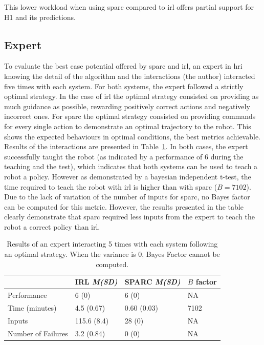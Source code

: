 This lower workload when using \gls{sparc} compared to \gls{irl} offers partial support for H1 and its predictions.

\subsection{Expert} \label{ssec:control_expert}

To evaluate the best case potential offered by \gls{sparc} and \gls{irl}, an expert in \gls{hri} knowing the detail of the algorithm and the interactions (the author) interacted five times with each system. For both systems, the expert followed a strictly optimal strategy. In the case of \gls{irl} the optimal strategy consisted on providing as much guidance as possible, rewarding positively correct actions and negatively incorrect ones. For \gls{sparc} the optimal strategy consisted on providing commands for every single action to demonstrate an optimal trajectory to the robot. This shows the expected behaviours in optimal conditions, the best metrics achievable. Results of the interactions are presented in Table~\ref{tab:control_expert}. In both cases, the expert successfully taught the robot (as indicated by a performance of 6 during the teaching and the test), which indicates that both systems can be used to teach a robot a policy. However as demonstrated by a bayesian independent t-test, the time required to teach the robot with \gls{irl} is higher than with \gls{sparc} ($B=7102$). Due to the lack of variation of the number of inputs for \gls{sparc}, no Bayes factor can be computed for this metric. However, the results presented in the table clearly demonstrate that \gls{sparc} required less inputs from the expert to teach the robot a correct policy than \gls{irl}.

\begin{table}[ht]
	\centering
	\caption{Results of an expert interacting 5 times with each system following an optimal strategy. When the variance is 0, Bayes Factor cannot be computed.}
	\label{tab:control_expert}
	\begin{tabular}{@{}llll@{}}\toprule
		&IRL \textit{M(SD)} & SPARC \textit{M(SD)} & $B$ factor\\
		\midrule
		Performance & 6 (0) & 6 (0) & NA \\
		Time (minutes) & 4.5 (0.67) & 0.60 (0.03) & 7102 \\
		Inputs & 115.6 (8.4) & 28 (0) & NA \\
		Number of Failures & 3.2 (0.84) & 0 (0) & NA \\
		\bottomrule
	\end{tabular}
\end{table}

